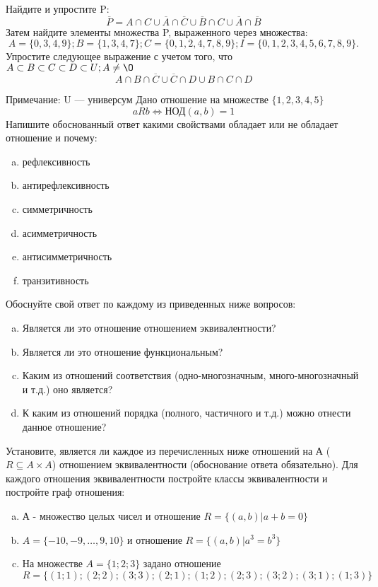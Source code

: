 \documentclass[10pt]{exam}
\begin{document}
\begin{questions}
\question
Найдите и упростите P:
\begin{equation*}
\overline{P} = A \cap C \cup \overline{A} \cap \overline{C} \cup \overline{B} \cap C \cup \overline{A} \cap \overline{B}
\end{equation*}
Затем найдите элементы множества P, выраженного через множества:
\begin{equation*}
A = \{0, 3, 4, 9\}; 
B = \{1, 3, 4, 7\};
C = \{0, 1, 2, 4, 7, 8, 9\};
I = \{0, 1, 2, 3, 4, 5, 6, 7, 8, 9\}.
\end{equation*}\question
Упростите следующее выражение с учетом того, что $A\subset B \subset C \subset D \subset U; A \neq \O$
\begin{equation*}
A \cap B  \cap \overline{C} \cup \overline{C} \cap D \cup B \cap C \cap D
\end{equation*}

Примечание: U — универсум\question
Дано отношение на множестве $\{1, 2, 3, 4, 5\}$ 
\begin{equation*}
aRb \iff  \text{НОД}(a,b) =1
\end{equation*}
Напишите обоснованный ответ какими свойствами обладает или не обладает отношение и почему:   
\begin{enumerate} [a)]\setcounter{enumi}{0}
\item рефлексивность
\item антирефлексивность
\item симметричность
\item асимметричность
\item антисимметричность
\item транзитивность
\end{enumerate}

Обоснуйте свой ответ по каждому из приведенных ниже вопросов:
\begin{enumerate} [a)]\setcounter{enumi}{0}
    \item Является ли это отношение отношением эквивалентности?
    \item Является ли это отношение функциональным?
    \item Каким из отношений соответствия (одно-многозначным, много-многозначный и т.д.) оно является?
    \item К каким из отношений порядка (полного, частичного и т.д.) можно отнести данное отношение?
\end{enumerate}


\question
Установите, является ли каждое из перечисленных ниже отношений на А ($R \subseteq A \times A$) отношением эквивалентности (обоснование ответа обязательно). Для каждого отношения эквивалентности 
постройте классы эквивалентности и постройте граф отношения:
\begin{enumerate}[a)]\setcounter{enumi}{0}
\item А - множество целых чисел и отношение $R = \{(a,b)|a + b = 0\}$
\item $A = \{-10, -9, …, 9, 10\}$ и отношение $R = \{(a,b)|a^{3} = b^{3}\}$
\item На множестве $A = \{1; 2; 3\}$ задано отношение $R = \{(1; 1); (2; 2); (3; 3); (2; 1); (1; 2); (2; 3); (3; 2); (3; 1); (1; 3)\}$


\end{enumerate}
\end{questions}
\end{document}
